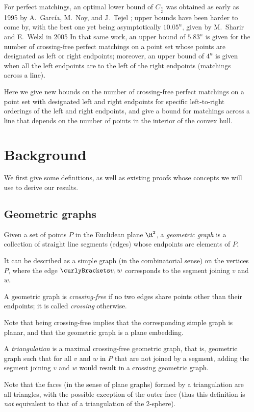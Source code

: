 \documentclass[10pt, a4paper, twoside]{basestyle}
\begin{document}
For perfect matchings, an optimal lower bound of $C_{\frac n 2}$ was obtained as early as 1995 by A.~García,
M.~Noy, and J.~Tejel \cite{GarciaNoyTejel2000}; upper bounds have been harder to come by, with the best one
yet being asymptotically $10.05^n$, given by M.~Sharir and E.~Welzl in 2005 \cite{SharirWelzl2006}
In that same work, an upper bound of $5.83^n$ is given for the number of crossing-free perfect matchings on a
point set whose points are designated as left or right endpoints; moreover, an upper bound of $4^n$ is given
when all the left endpoints are to the left of the right endpoints (matchings across a line).

Here we give new bounds on the number of crossing-free perfect matchings on a point set with designated left and
right endpoints for specific left-to-right orderings of the left and right endpoints, and give a bound for
matchings across a line that depends on the number of points in the interior of the convex hull.
\section{Background}
We first give some definitions, as well as existing proofs whose concepts we will use to derive our results.
\subsection{Geometric graphs}
\begin{definition}
Given a set of points $P$ in the Euclidean plane $\R^2$,
a \emph{geometric graph} is a collection of straight line segments (edges)
whose endpoints are elements of $P$.

It can be described as a simple graph (in the combinatorial sense)
on the vertices $P$, where the edge $\set{v,w}$ corresponds to the segment joining
$v$ and $w$.
\end{definition}
\begin{definition}
A geometric graph is \emph{crossing-free} if no two edges share points other than
their endpoints; it is called \emph{crossing} otherwise.
\end{definition}
Note that being crossing-free implies that the corresponding simple graph is planar, and that the
geometric graph is a plane embedding.
\begin{sloppypar}
\begin{definition}[triangulation]
A \emph{triangulation} is a maximal crossing-free geometric graph, that is,
geometric graph such that for all $v$ and $w$ in $P$ that are not joined by a
segment, adding the segment joining $v$ and $w$ would result in a crossing
geometric graph.
\end{definition}
Note that the faces (in the sense of plane graphs) formed by a triangulation are
all triangles, with the possible exception of the outer face (thus this definition
is \emph{not} equivalent to that of a triangulation of the $2$-sphere).
\end{sloppypar}
\end{document}
